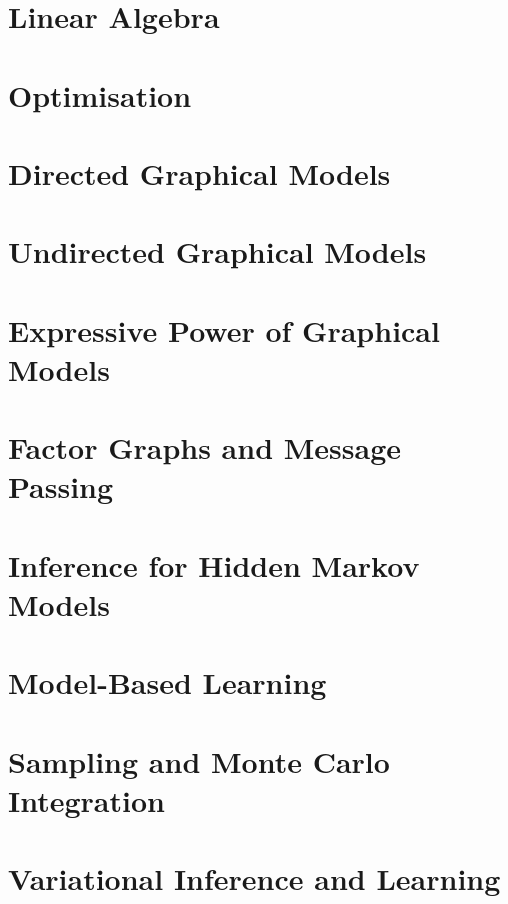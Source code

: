 \documentclass[11pt,a4paper,twoside,openright]{book}
\let\origdoublepage\cleardoublepage
\newcommand{\clearemptydoublepage}{%
  \clearpage
  {\pagestyle{empty}\origdoublepage}%
}
\let\cleardoublepage\clearemptydoublepage
\begin{document}
\frontmatter


\newpage


\dominitoc
\setcounter{tocdepth}{1}    %
\setcounter{secnumdepth}{1} %
\tableofcontents
\cleardoublepage



\mainmatter

\chapter{Linear Algebra}
\minitoc
 

\chapter{Optimisation} 
\minitoc
 

\chapter{Directed Graphical Models} 
\minitoc
 

\chapter{Undirected Graphical Models}
\minitoc
 

\chapter{Expressive Power of Graphical Models} 
\minitoc
 

\chapter{Factor Graphs and Message Passing} 
\minitoc
 

\chapter{Inference for Hidden Markov Models}
\minitoc
 

\chapter{Model-Based Learning} 
\minitoc


\chapter{Sampling and Monte Carlo Integration}
\minitoc


\chapter{Variational Inference and Learning}
\minitoc



\end{document}
